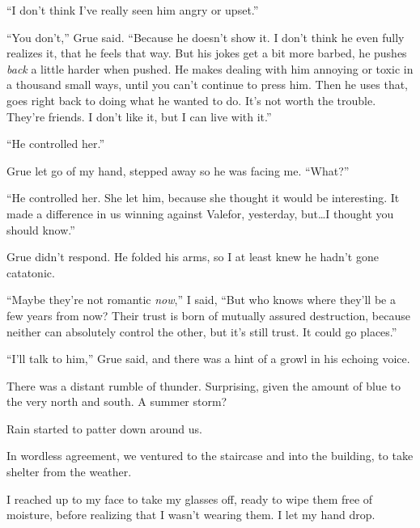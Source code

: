 ``I don't think I've really seen him angry or upset.''



``You don't,'' Grue said.  ``Because he doesn't show it.  I don't think he even fully realizes it, that he feels that way.  But his jokes get a bit more barbed, he pushes \emph{back} a little harder when pushed.  He makes dealing with him annoying or toxic in a thousand small ways, until you can't continue to press him.  Then he uses that, goes right back to doing what he wanted to do.  It's not worth the trouble.  They're friends.  I don't like it, but I can live with it.''



``He controlled her.''



Grue let go of my hand, stepped away so he was facing me.  ``What?''



``He controlled her.  She let him, because she thought it would be interesting.  It made a difference in us winning against Valefor, yesterday, but\ldots I thought you should know.''



Grue didn't respond.  He folded his arms, so I at least knew he hadn't gone catatonic.



``Maybe they're not romantic \emph{now},'' I said, ``But who knows where they'll be a few years from now?  Their trust is born of mutually assured destruction, because neither can absolutely control the other, but it's still trust.  It could go places.''



``I'll talk to him,'' Grue said, and there was a hint of a growl in his echoing voice.



There was a distant rumble of thunder.  Surprising, given the amount of blue to the very north and south.  A summer storm?



Rain started to patter down around us.



In wordless agreement, we ventured to the staircase and into the building, to take shelter from the weather.



I reached up to my face to take my glasses off, ready to wipe them free of moisture, before realizing that I wasn't wearing them.  I let my hand drop.



